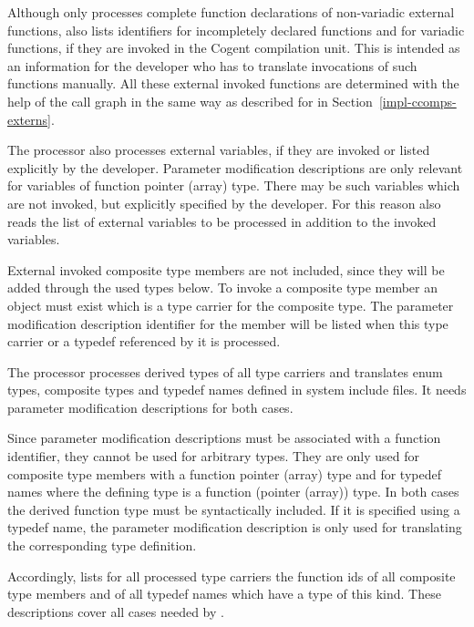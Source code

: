 Although  only processes complete function declarations of non-variadic external functions, 
 also lists identifiers for incompletely declared functions and for variadic functions,
if they are invoked in the Cogent compilation unit. This is intended as an 
information for the developer who has to translate invocations of such functions manually. All these
external invoked functions are determined with the help of the call graph in the same way as described for 
 in Section~\ref{impl-ccomps-externs}.

The processor  also processes external variables, if they are invoked or listed explicitly
by the developer. Parameter modification descriptions are only relevant for variables of function pointer (array)
type. There may be such variables which are not invoked, but explicitly specified by the developer. For this
reason  also reads the list of external variables to be processed in addition to the
invoked variables.

External invoked composite type members are not included, since they will be added through the used types below. To invoke 
a composite type member an object must exist which is a type carrier for the composite type. The parameter modification
description identifier for the member will be listed when this type carrier or a typedef referenced by it
is processed.

The processor  processes derived types of all type carriers and translates enum types,
composite types and typedef names defined in system include files. It needs parameter modification descriptions
for both cases. 

Since parameter modification descriptions must be associated with a function identifier, they cannot be used
for arbitrary types. They are only used for composite type members with a function pointer (array) type and 
for typedef names where the defining type is a function (pointer (array)) type. In both cases the derived
function type must be syntactically included. If it is specified using a typedef name, the parameter modification
description is only used for translating the corresponding type definition.

Accordingly,  lists for all processed type carriers the function ids of all composite type
members and of all typedef names which have a type of this kind. These descriptions cover all cases needed
by .

